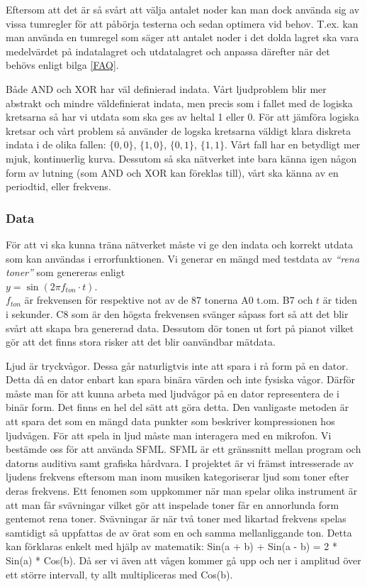 \documentclass[a4paper,10pt]{article}
\begin{document}
Eftersom att det är så svårt att välja antalet noder kan man dock använda sig av vissa tumregler för att påbörja testerna och sedan optimera vid behov. T.ex. kan man använda en tumregel som säger att antalet noder i det dolda lagret ska vara medelvärdet på indatalagret och utdatalagret \autocite{StackExchange} och anpassa därefter när det behövs enligt bilga \ref{FAQ}.

Både AND och XOR har väl definierad indata. Vårt ljudproblem blir mer abstrakt och mindre väldefinierat indata, men precis som i fallet med de logiska kretsarna så har vi utdata som ska ges av heltal 1 eller 0. För att jämföra logiska kretsar och vårt problem så använder de logska kretsarna väldigt klara diskreta indata i de olika fallen: $\{0,0\}$, $\{1,0\}$, $\{0,1\}$, $\{1,1\}$. Vårt fall har en betydligt mer mjuk, kontinuerlig kurva. Dessutom så ska nätverket inte bara känna igen någon form av lutning (som AND och XOR kan föreklas till), vårt ska känna av en periodtid, eller frekvens. 

\subsubsection{Data}
För att vi ska kunna träna nätverket måste vi ge den indata och korrekt utdata som kan användas i errorfunktionen. Vi generar en mängd med testdata av\emph{ ``rena toner''} som genereras enligt \\$y=\sin(2\pi f_{ton} \cdot t)$.\autocite{Wave}\\
$f_{ton}$ är frekvensen för respektive not av de 87 tonerna A0 t.om. B7 och $t$ är tiden i sekunder. C8 som är den högsta frekvensen svänger såpass fort så att det blir svårt att skapa bra genererad data. Dessutom dör tonen ut fort på pianot vilket gör att det finns stora risker att det blir oanvändbar mätdata.

Ljud är tryckvågor. Dessa går naturligtvis inte att spara i rå form på en dator. Detta då en dator enbart kan spara binära värden och inte fysiska vågor. Därför måste man för att kunna arbeta med ljudvågor på en dator representera de i binär form. Det finns en hel del sätt att göra detta. Den vanligaste metoden är att spara det som en mängd data punkter som beskriver kompressionen hos ljudvågen. 
För att spela in ljud måste man interagera med en mikrofon. Vi bestämde oss för att använda SFML. SFML är ett gränssnitt mellan program och datorns auditiva samt grafiska hårdvara.  
I projektet är vi främst intresserade av ljudens frekvens eftersom man inom musiken kategoriserar ljud som toner efter deras frekvens. Ett fenomen som uppkommer när man spelar olika instrument är att man får svävningar vilket gör att inspelade toner får en annorlunda form gentemot rena toner. Svävningar är när två toner med likartad frekvens spelas samtidigt så uppfattas de av örat som en och samma mellanliggande ton\autocite{BEAT}. Detta kan förklaras enkelt med hjälp av matematik: Sin(a + b) + Sin(a - b) = 2 * Sin(a) * Cos(b). Då ser vi även att vågen kommer gå upp och ner i amplitud över ett större intervall, ty allt multipliceras med Cos(b). 
\end{document}

